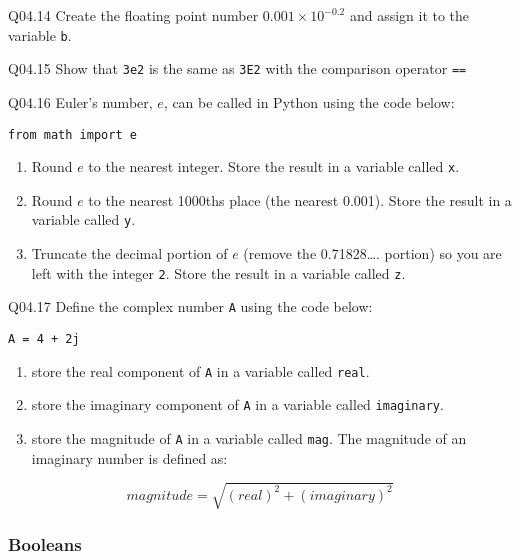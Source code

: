 \documentclass{book}
\newcommand{\passthrough}[1]{#1}
\begin{document}
Q04.14 Create the floating point number \(0.001 \times 10^{-0.2}\) and
assign it to the variable \passthrough{\lstinline!b!}.

Q04.15 Show that \passthrough{\lstinline!3e2!} is the same as
\passthrough{\lstinline!3E2!} with the comparison operator
\passthrough{\lstinline!==!}

Q04.16 Euler's number, \(e\), can be called in Python using the code
below:

\begin{lstlisting}
from math import e
\end{lstlisting}

\begin{enumerate}
\def\labelenumi{(\alph{enumi})}
\item
  Round \(e\) to the nearest integer. Store the result in a variable
  called \passthrough{\lstinline!x!}.
\item
  Round \(e\) to the nearest 1000ths place (the nearest 0.001). Store
  the result in a variable called \passthrough{\lstinline!y!}.
\item
  Truncate the decimal portion of \(e\) (remove the 0.71828\ldots{}.
  portion) so you are left with the integer \passthrough{\lstinline!2!}.
  Store the result in a variable called \passthrough{\lstinline!z!}.
\end{enumerate}

Q04.17 Define the complex number \passthrough{\lstinline!A!} using the
code below:

\passthrough{\lstinline!A = 4 + 2j!}

\begin{enumerate}
\def\labelenumi{(\alph{enumi})}
\item
  store the real component of \passthrough{\lstinline!A!} in a variable
  called \passthrough{\lstinline!real!}.
\item
  store the imaginary component of \passthrough{\lstinline!A!} in a
  variable called \passthrough{\lstinline!imaginary!}.
\item
  store the magnitude of \passthrough{\lstinline!A!} in a variable
  called \passthrough{\lstinline!mag!}. The magnitude of an imaginary
  number is defined as:
\end{enumerate}

\[ magnitude = \sqrt{(real)^2+(imaginary)^2} \]
    




    
        \hypertarget{booleans}{%
\subsubsection{Booleans}\label{booleans}}
\end{document}

